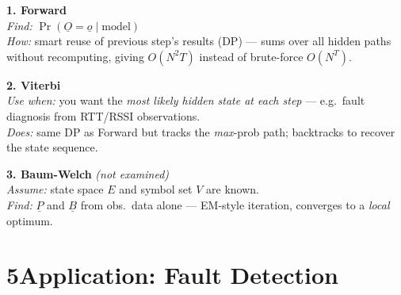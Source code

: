 \documentclass[10pt,a4paper]{article}
\begin{document}
\vspace{2pt}

\begin{minipage}[t]{0.31\textwidth}
\vspace{0pt}
\begin{keybox}
\small\textbf{1. Forward}\\
\textit{Find:} $\Pr(\underline{O}{=}\underline{o} \mid \text{model})$\\[3pt]
\textit{How:} smart reuse of previous step's results (DP) --- sums over all hidden paths without recomputing, giving $O(N^2 T)$ instead of brute-force $O(N^T)$.
\end{keybox}
\end{minipage}\hfill
\begin{minipage}[t]{0.31\textwidth}
\vspace{0pt}
\begin{keybox}
\small\textbf{2. Viterbi}\\
\textit{Use when:} you want the \emph{most likely hidden state at each step} --- e.g.\ fault diagnosis from RTT/RSSI observations.\\[3pt]
\textit{Does:} same DP as Forward but tracks the \emph{max}-prob path; backtracks to recover the state sequence.
\end{keybox}
\end{minipage}\hfill
\begin{minipage}[t]{0.31\textwidth}
\vspace{0pt}
\begin{notebox}
\small\textbf{3. Baum-Welch} \textit{(not examined)}\\
\textit{Assume:} state space $E$ and symbol set $V$ are known.\\[3pt]
\textit{Find:} $\underline{P}$ and $\underline{B}$ from obs.\ data alone --- EM-style iteration, converges to a \emph{local} optimum.
\end{notebox}
\end{minipage}

\vspace{4pt}

\section*{5\quad Application: Fault Detection}

\vspace{2pt}
\end{document}
